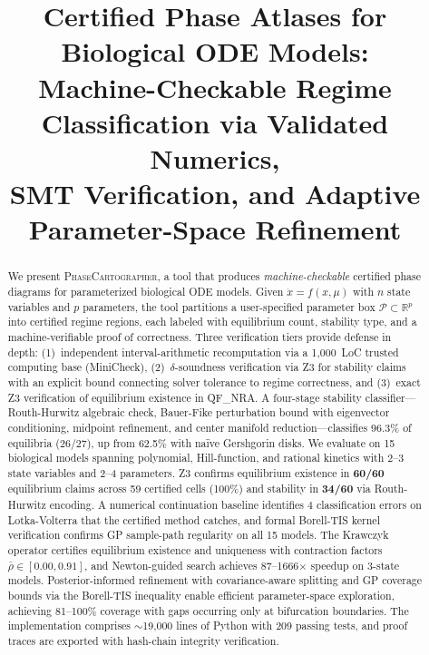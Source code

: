 \documentclass[11pt]{article}
\title{Certified Phase Atlases for Biological ODE Models:\\
Machine-Checkable Regime Classification via Validated Numerics,\\
SMT Verification, and Adaptive Parameter-Space Refinement}
\date{}
\newcommand{\R}{\mathbb{R}}
\newcommand{\PC}{\textsc{PhaseCartographer}}
\begin{document}
\maketitle

\begin{abstract}
We present \PC{}, a tool that produces \emph{machine-checkable} certified phase diagrams for parameterized biological ODE models.
Given $\dot{x} = f(x, \mu)$ with $n$ state variables and $p$ parameters, the tool partitions a user-specified parameter box $\mathcal{P} \subset \R^p$ into certified regime regions, each labeled with equilibrium count, stability type, and a machine-verifiable proof of correctness.
Three verification tiers provide defense in depth: (1)~independent interval-arithmetic recomputation via a 1{,}000~LoC trusted computing base (MiniCheck), (2)~$\delta$-soundness verification via Z3 for stability claims with an explicit bound connecting solver tolerance to regime correctness, and (3)~exact Z3 verification of equilibrium existence in QF\_NRA.
A four-stage stability classifier---Routh-Hurwitz algebraic check, Bauer-Fike perturbation bound with eigenvector conditioning, midpoint refinement, and center manifold reduction---classifies 96.3\% of equilibria (26/27), up from 62.5\% with na\"ive Gershgorin disks.
We evaluate on 15 biological models spanning polynomial, Hill-function, and rational kinetics with 2--3 state variables and 2--4 parameters.
Z3 confirms equilibrium existence in \textbf{60/60} equilibrium claims across 59 certified cells (100\%) and stability in \textbf{34/60} via Routh-Hurwitz encoding.
A numerical continuation baseline identifies 4 classification errors on Lotka-Volterra that the certified method catches, and formal Borell-TIS kernel verification confirms GP sample-path regularity on all 15 models.
The Krawczyk operator certifies equilibrium existence and uniqueness with contraction factors $\bar\rho \in [0.00, 0.91]$, and Newton-guided search achieves 87--1666$\times$ speedup on 3-state models.
Posterior-informed refinement with covariance-aware splitting and GP coverage bounds via the Borell-TIS inequality enable efficient parameter-space exploration, achieving 81--100\% coverage with gaps occurring only at bifurcation boundaries.
The implementation comprises ${\sim}$19{,}000 lines of Python with 209 passing tests, and proof traces are exported with hash-chain integrity verification.
\end{abstract}

\end{document}
